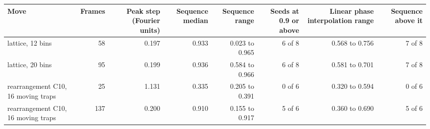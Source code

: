 \begin{tabular}{@{}l r r r r r r r@{}}
\toprule
Move & Frames & Peak step (Fourier units) & Sequence median & Sequence range & Seeds at 0.9 or above & Linear phase interpolation range & Sequence above it \\
\midrule
lattice, 12 bins & 58 & 0.197 & 0.933 & 0.023 to 0.965 & 6 of 8 & 0.568 to 0.756 & 7 of 8 \\
lattice, 20 bins & 95 & 0.199 & 0.936 & 0.584 to 0.966 & 6 of 8 & 0.581 to 0.701 & 7 of 8 \\
rearrangement C10, 16 moving traps & 25 & 1.131 & 0.335 & 0.205 to 0.391 & 0 of 6 & 0.320 to 0.594 & 0 of 6 \\
rearrangement C10, 16 moving traps & 137 & 0.200 & 0.910 & 0.155 to 0.917 & 5 of 6 & 0.360 to 0.690 & 5 of 6 \\
\bottomrule
\end{tabular}
